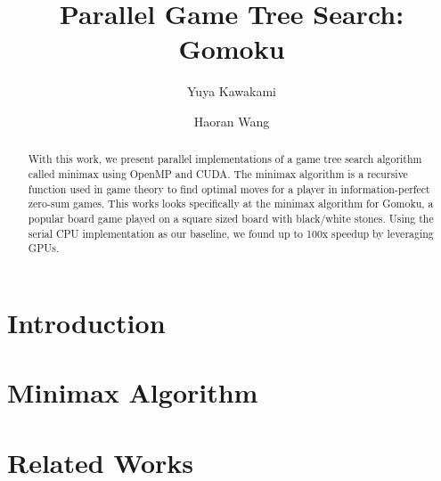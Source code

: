 \documentclass[sigconf, noacm = true, 11pt]{acmart}
\begin{document}
\title{Parallel Game Tree Search: Gomoku}

\author{Yuya Kawakami}

\author{Haoran Wang}




\begin{abstract}
With this work, we present parallel implementations of a game tree search algorithm called minimax using OpenMP and CUDA. The minimax algorithm is a recursive function used in game theory to find optimal moves for a player in information-perfect zero-sum games. This works looks specifically at the minimax algorithm for Gomoku, a popular board game played on a square sized board with black/white stones. Using the serial CPU implementation as our baseline, we found up to 100x speedup by leveraging GPUs. 

\end{abstract}

\maketitle

\section{Introduction}
\label{sec:intro}


\section{Minimax Algorithm}
\label{sec:minimax}


\section{Related Works}
\label{sec:relworks}

\end{document}
